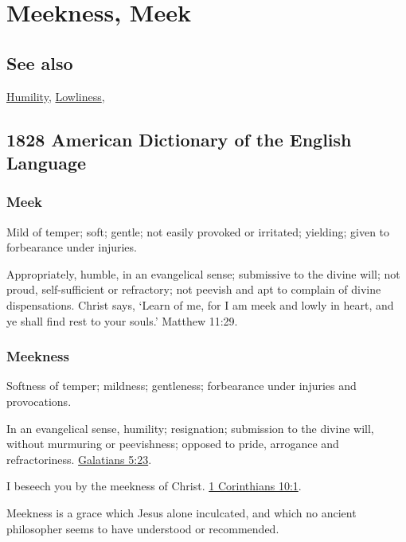 \section{Meekness, Meek}
	\label{MEEKNESS}
	
\subsection{See also}

	\hyperref[HUMILITY]{Humility}, \hyperref[LOWLINESS]{Lowliness},

\subsection{1828 American Dictionary of the English Language} %
	\label{MEEKNESS-1828}
	
	\subsubsection{Meek}
	
		\begin{compactitem}
			\item[1] Mild of temper; soft; gentle; not easily provoked or irritated; yielding; given to forbearance under injuries.
			\item[2] Appropriately, humble, in an evangelical sense; submissive to the divine will; not proud, self-sufficient or refractory; not peevish and apt to complain of divine dispensations. Christ says, `Learn of me, for I am meek and lowly in heart, and ye shall find rest to your souls.' Matthew 11:29.
		\end{compactitem}
	
	\subsubsection{Meekness}

		\begin{compactitem}
			\item Softness of temper; mildness; gentleness; forbearance under injuries and provocations.
			\item[1] In an evangelical sense, humility; resignation; submission to the divine will, without murmuring or peevishness; opposed to pride, arrogance and refractoriness. \hyperref[GALATIANS-5-23]{Galatians 5:23}.
			\item I beseech you by the meekness of Christ. \hyperref[1CORINTHIANS-10-1]{1 Corinthians 10:1}.
			\item Meekness is a grace which Jesus alone inculcated, and which no ancient philosopher seems to have understood or recommended.
		\end{compactitem}


